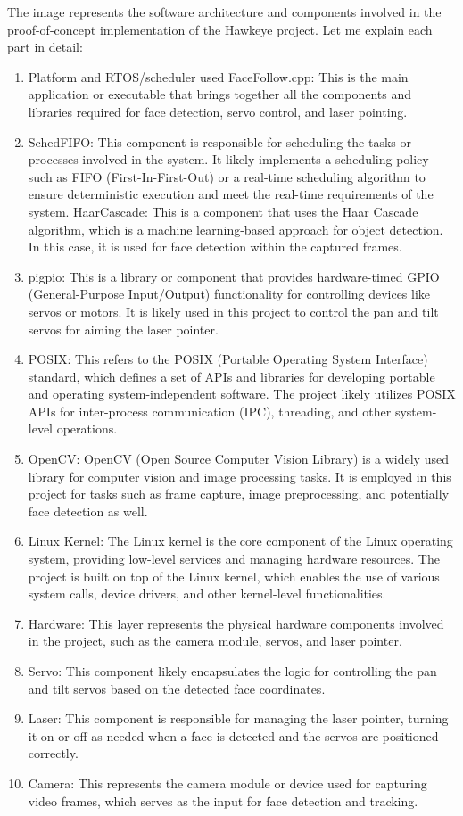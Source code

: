 \documentclass[a4paper,11pt]{article}%
\begin{document}
The image represents the software architecture and components involved in the proof-of-concept implementation of the Hawkeye project. Let me explain each part in detail:
\begin{enumerate}
    \item Platform and RTOS/scheduler used
    FaceFollow.cpp: This is the main application or executable that brings together all the components and libraries required for face detection, servo control, and laser pointing.
    \item SchedFIFO: This component is responsible for scheduling the tasks or processes involved in the system. It likely implements a scheduling policy such as FIFO (First-In-First-Out) or a real-time scheduling algorithm to ensure deterministic execution and meet the real-time requirements of the system.
    HaarCascade: This is a component that uses the Haar Cascade algorithm, which is a machine learning-based approach for object detection. In this case, it is used for face detection within the captured frames.
    \item  pigpio: This is a library or component that provides hardware-timed GPIO (General-Purpose Input/Output) functionality for controlling devices like servos or motors. It is likely used in this project to control the pan and tilt servos for aiming the laser pointer.
    \item POSIX: This refers to the POSIX (Portable Operating System Interface) standard, which defines a set of APIs and libraries for developing portable and operating system-independent software. The project likely utilizes POSIX APIs for inter-process communication (IPC), threading, and other system-level operations.
    \item OpenCV: OpenCV (Open Source Computer Vision Library) is a widely used library for computer vision and image processing tasks. It is employed in this project for tasks such as frame capture, image preprocessing, and potentially face detection as well.
    \item  Linux Kernel: The Linux kernel is the core component of the Linux operating system, providing low-level services and managing hardware resources. The project is built on top of the Linux kernel, which enables the use of various system calls, device drivers, and other kernel-level functionalities.
    \item Hardware: This layer represents the physical hardware components involved in the project, such as the camera module, servos, and laser pointer.
    \item Servo: This component likely encapsulates the logic for controlling the pan and tilt servos based on the detected face coordinates.
    \item Laser: This component is responsible for managing the laser pointer, turning it on or off as needed when a face is detected and the servos are positioned correctly.
    \item Camera: This represents the camera module or device used for capturing video frames, which serves as the input for face detection and tracking.
\end{enumerate}
\end{document}
